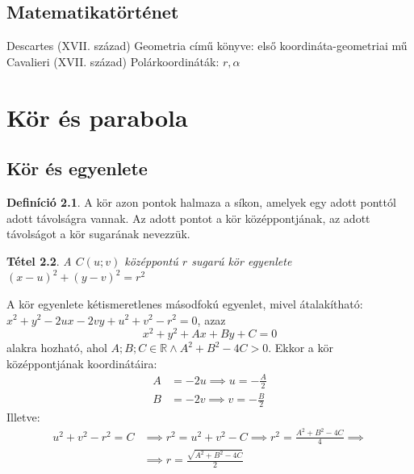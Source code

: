 \documentclass[twoside,12pt]{report}
\newtheorem{theorem}{Tétel}[section]
\theoremstyle{definition}
\newtheorem{definition}[theorem]{Definíció}
\begin{document}
\section{Matematikatörténet}
	\begin{outline}
		\1 Descartes (XVII. század)
			\2 Geometria című könyve: első koordináta-geometriai mű
		\1 Cavalieri (XVII. század)
			\2 Polárkoordináták: $r,\alpha$
	\end{outline}
\chapter{Kör és parabola}
\section{Kör és egyenlete}
	\begin{definition}
		A kör azon pontok halmaza a síkon, amelyek egy adott ponttól adott távolságra vannak.
		Az adott pontot a kör középpontjának, az adott távolságot a kör sugarának nevezzük.
	\end{definition}
	\begin{theorem}
		A $C(u;v)$ középpontú $r$ sugarú kör egyenlete $(x-u)^2+(y-v)^2=r^2$
	\end{theorem}
	A kör egyenlete kétismeretlenes másodfokú egyenlet, mivel átalakítható: $x^2+y^2-2ux-2vy+u^2+v^2-r^2=0$, azaz
	\begin{equation*}
		x^2+y^2+Ax+By+C=0
	\end{equation*}
	alakra hozható, ahol $A;B;C\in\mathbb{R}\wedge A^2+B^2-4C>0$. Ekkor a kör középpontjának koordinátáira:
	\begin{align*}
		A&=-2u\implies u=-\frac{A}{2}\\
		B&=-2v\implies v=-\frac{B}{2}
	\end{align*}
	Illetve:
	\begin{align*}
		u^2+v^2-r^2=C&\implies r^2=u^2+v^2-C\implies r^2=\frac{A^2+B^2-4C}{4}\implies \\&\implies r=\frac{\sqrt{A^2+B^2-4C}}{2}
	\end{align*}
\end{document}
